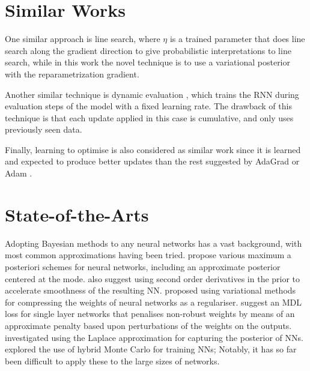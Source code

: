 \section{Similar Works}
One similar approach is line search, where $\eta$ is a trained parameter that does line search along the gradient direction to give probabilistic interpretations to line search, while in this work the novel technique is to use a variational posterior with the reparametrization gradient.

Another similar technique is dynamic evaluation \cite{Mikolov2010}, which trains the RNN during evaluation steps of the model with a fixed learning rate. The drawback of this technique is that each update applied in this case is cumulative, and only uses previously seen data.

Finally, learning to optimise \cite{Li2016a} is also considered as similar work since it is learned and expected to produce better updates than the rest suggested by AdaGrad \cite{Duchi2011} or Adam \cite{Kingma2013a}. 

\section{State-of-the-Arts}
Adopting Bayesian methods to any neural networks has a vast background, with most common approximations having been tried.
\cite{Buntine1991} propose various maximum a posteriori schemes for neural networks, including an approximate posterior
centered at the mode.
\cite{Buntine1991} also suggest using second order derivatives in the prior to accelerate smoothness of the resulting NN.
\cite{Hinton1993} proposed using variational methods for compressing the weights of neural networks as a regulariser.
\cite{Hochreiter1995} suggest an MDL loss for single layer networks that penalises non-robust weights by means of an approximate penalty based upon perturbations of the weights on the outputs.
\cite{Mackay1995} investigated using the Laplace approximation for capturing the posterior of NNs.
\cite{Diggle} explored the use of hybrid Monte Carlo for training NNs; Notably, it has so far been difficult to apply these to the large sizes of networks.

